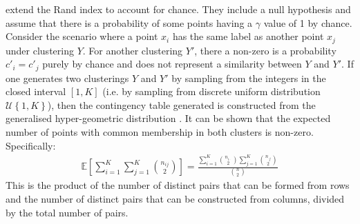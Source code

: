 \documentclass[12pt]{article} %
\begin{document}
\citet{HubertComparingpartitions1985} extend the Rand index to account for chance. They include a null hypothesis and assume that there is a probability of some points having a $\gamma$ value of 1 by chance. Consider the scenario where a point $x_i$ has the same label as another point $x_j$ under clustering $Y$. For another clustering $Y'$, there a non-zero is a probability $c'_i=c'_j$ purely by chance and does not represent a similarity between $Y$ and $Y'$. If one generates two clusterings $Y$ and $Y'$ by sampling from the integers in the closed interval $[1,K]$ (i.e. by sampling from discrete uniform distribution $\mathcal{U}\left\{1,K\right\}$), then the contingency table generated is constructed from the generalised hyper-geometric distribution \cite{HubertComparingpartitions1985}. It can be shown that the expected number of points with common membership in both clusters is non-zero. Specifically:
\begin{eqnarray}
\mathbb{E}\left[\sum_{i=1}^K \sum_{j=1}^K\binom{n_{ij}}{2}\right] = \frac{\sum_{i=1}^K \binom{n_{i\cdot}}{2} \sum_{j=1}^K \binom{n_{\cdot j}}{2}}{\binom{n}{2}}
\end{eqnarray}
This is the product of the number of distinct pairs that can be formed from rows and the number of distinct pairs that can be constructed from columns, divided by the total number of pairs. 
\end{document}
